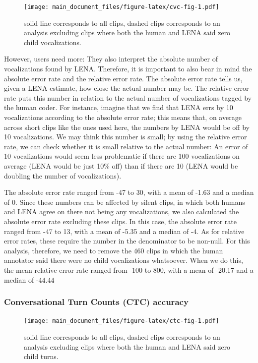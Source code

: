 \documentclass[english,floatsintext,man]{apa6}
\begin{document}
\begin{figure}
\centering
\texttt{[image: main\_document\_files/figure-latex/cvc-fig-1.pdf]}
\caption{\label{fig:cvc-fig}solid line corresponds to all clips, dashed
clips corresponds to an analysis excluding clips where both the human
and LENA said zero child vocalizations.}
\end{figure}

However, users need more: They also interpret the absolute number of
vocalizations found by LENA. Therefore, it is important to also bear in
mind the absolute error rate and the relative error rate. The absolute
error rate tells us, given a LENA estimate, how close the actual number
may be. The relative error rate puts this number in relation to the
actual number of vocalizations tagged by the human coder. For instance,
imagine that we find that LENA errs by 10 vocalizations according to the
absolute error rate; this means that, on average across short clips like
the ones used here, the numbers by LENA would be off by 10
vocalizations. We may think this number is small; by using the relative
error rate, we can check whether it is small relative to the actual
number: An error of 10 vocalizations would seem less problematic if
there are 100 vocalizations on average (LENA would be just 10\% off)
than if there are 10 (LENA would be doubling the number of
vocalizations).

The absolute error rate ranged from -47 to 30, with a mean of -1.63 and
a median of 0. Since these numbers can be affected by silent clips, in
which both humans and LENA agree on there not being any vocalizations,
we also calculated the absolute error rate excluding these clips. In
this case, the absolute error rate ranged from -47 to 13, with a mean of
-5.35 and a median of -4. As for relative error rates, these require the
number in the denominator to be non-null. For this analysis, therefore,
we need to remove the 460 clips in which the human annotator said there
were no child vocalizations whatsoever. When we do this, the mean
relative error rate ranged from -100 to 800, with a mean of -20.17 and a
median of -44.44

\subsubsection{Conversational Turn Counts (CTC)
accuracy}\label{conversational-turn-counts-ctc-accuracy}

\begin{figure}
\centering
\texttt{[image: main\_document\_files/figure-latex/ctc-fig-1.pdf]}
\caption{\label{fig:ctc-fig}solid line corresponds to all clips, dashed
clips corresponds to an analysis excluding clips where both the human
and LENA said zero child turns.}
\end{figure}
\end{document}
